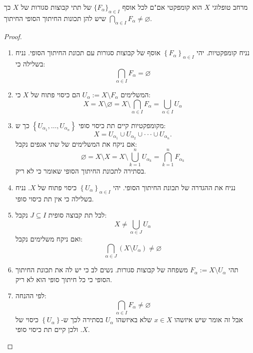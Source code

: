 \documentclass{tstextbook}
\begin{document}
\begin{proposition}
מרחב טופלוגי \(X\) הוא קומפקטי אם"ם לכל אוסף \(\{ F_{\alpha} \}_{\alpha \in I}\) של תתי קבוצות סגורות של \(X\) כך שיש להן תכונות החיתוך הסופי החיתוך \(\bigcap_{\alpha \in I}F_{\alpha}\neq \varnothing\). 

\end{proposition}
\begin{proof}
  \begin{enumerate}
    \item נניח קומפקטיות. יהי \(\left\{  F_{\alpha}  \right\}_{\alpha \in I}\) אוסף של קבוצות סגורות עם תכונת החיתוך הסופי. נניח בשלילה כי: 
$$\bigcap_{\alpha \in I}F_{\alpha}=\varnothing $$


    \item המשלימים \(U_{\alpha}:=X\setminus F_{\alpha}\) הם כיסוי פתוח של \(X\) כי: 
$$X=X\setminus\varnothing=X\setminus\bigcap_{\alpha\in I}F_{\alpha}=\bigcup_{\alpha\in I}U_{\alpha}$$


    \item מקומפקטיות קיים תת כיסוי סופי \(\left\{  U_{\alpha_{1}},\dots,U_{\alpha_{n}}  \right\}\) כך ש: 
$$X=U_{\alpha_{1}}\cup U_{\alpha_{2}}\cup\cdot\cdot\cdot\cup U_{\alpha_{n}}.$$
אם ניקח את המשלימים של שתי אגפים נקבל:
$$\varnothing=X\setminus X=X\setminus\bigcup_{k=1}^{n}U_{\alpha_{k}}=\bigcap_{k=1}^{n}F_{\alpha_{k}}$$
בסתירה לתכונת החיתוך הסופי שאומר כי לא ריק.


    \item נניח את ההגדרה של תכונת החיתוך הסופי. יהי \(\left\{  U_{\alpha}  \right\}_{\alpha \in I}\) כיסוי פתוח של \(X\). נניח בשלילה כי אין תת כיסוי סופי.  


    \item לכל תת קבוצה סופית \(J\subseteq I\) נקבל: 
$$X\neq\bigcup_{\alpha\in J}U_{\alpha}$$
ואם ניקח משלימים נקבל:
$$\bigcap_{\alpha\in J}(X\setminus U_{\alpha})\neq\varnothing$$


    \item תהי \(F_{\alpha}:= X \setminus U_{\alpha}\) משפחה של קבוצות סגורות. נשים לב כי יש לה את תכונת החיתוך הסופי כי כל חיתוך סופי הוא לא ריק. 


    \item לפי ההנחה: 
$$\bigcap_{\alpha\in I}F_{\alpha}\neq\varnothing$$
אבל זה אומר שיש איזשהו \(x \in X\) שלא באיזשהו \(U_{\alpha}\) בסתירה לכך ש-\(\left\{  U_{\alpha}  \right\}\) כיסוי של \(X\). ולכן קיים תת כיסוי סופי.


  \end{enumerate}
\end{proof}
\end{document}
